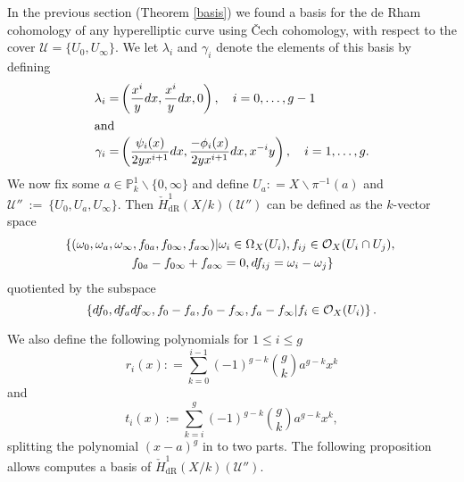 \documentclass[11pt]{article} %
\theoremstyle{plain}
\theoremstyle{remark}
\newcommand{\cO}{{\cal O}}
\newcommand{\cU}{{\mathcal U}}
\newcommand{\cech}{\v{C}ech }
\newcommand{\cechderhamhone}{\check{H}_{\text {dR}}^1(X/k)}
\begin{document}
In the previous section (Theorem \ref{basis}) we found a basis for the de Rham cohomology of any hyperelliptic curve using \cech cohomology, with respect to the cover $\cU = \{ U_0 , U_\infty\}$.
We let $\lambda_i$ and $\gamma_i$ denote the elements of this basis by defining
\begin{align*}
\lambda_i  = & \left( \frac{x^i}{y}dx, \frac{x^i}{y}dx, 0\right) ,\quad i=0, \ldots, g-1 \\
\intertext{and}
\gamma_i = & \left ( \frac{\psi_i(x)}{2yx^{i+1}}dx, \frac{-\phi_i(x)}{2yx^{i+1}}dx, x^{-i}y \right), \quad i=1,\ldots ,g.
\end{align*}
We now fix some $a \in \mathbb P_k^1\backslash \{0, \infty\}$ and define $U_a : = X \backslash \pi^{-1}(a)$ and $\cU''~:=~\{U_0,U_a, U_\infty\}$.
Then $\cechderhamhone(\cU'')$ can be defined as the $k$-vector space 
\begin{multline}\label{sixtupleconditions}
\left\{ (\omega_0, \omega_a, \omega_\infty , f_{0a}, f_{0 \infty},f_{a \infty}) | \omega_i \in \Omega_X(U_i), f_{ij} \in \cO_X(U_i \cap U_j), \right. \\ \left. f_{0a} - f_{0\infty} + f_{a \infty} = 0, df_{ij} = \omega_i - \omega_j \right\}
\end{multline}
quotiented by the subspace 
\[
\left\{ df_0, df_a df_\infty, f_0- f_a, f_0 - f_\infty, f_a - f_\infty | f_i \in \cO_X(U_i)\right\}.
\]

We also define the following polynomials for $1 \leq i \leq g$
\[
r_i(x) : = \sum_{k=0}^{i-1} (-1)^{g-k}\binom{g}{k} a^{g-k} x^k
\]
and
\[
t_i(x) := \sum_{k=i}^{g} (-1)^{g-k}\binom{g}{k} a^{g-k} x^k,
\]
splitting the polynomial $(x-a)^g$ in to two parts.
The following proposition allows computes a basis of $\cechderhamhone(\cU'')$.
\end{document}
